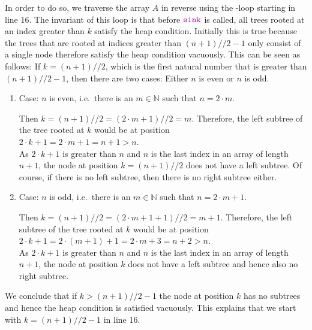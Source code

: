 \begin{enumerate}
\begin{enumerate}
            In order to do so, we traverse the array ${A}$ in reverse using the
            -loop starting in line 16.  The invariant of this loop is that before
            $\mytt{sink}$ is called, all trees rooted at an index greater than 
            ${k}$ satisfy the heap condition.  Initially this is true because the trees that
            are rooted at indices greater than  $(n + 1) // 2 - 1$  only
            consist of a single node therefore satisfy the heap condition vacuously.  This can be seen as
            follows:  If $k = (n + 1)//2$, which is the first 
            natural number that is greater than $(n + 1) // 2 - 1$, then there are two cases:
            Either $n$ is even or $n$ is odd.
            \begin{enumerate}
            \item Case: $n$ is even, i.e.~there is an $m\in \mathbb{N}$ such that $n = 2 \cdot m$.

                  Then $k = (n + 1)//2 = (2 \cdot m + 1) // 2 = m$.  Therefore, the left subtree of the tree 
                  rooted at $k$ would be at position 
                  \\[0.2cm]
                  \hspace*{1.3cm}
                  $2 \cdot k + 1 = 2 \cdot m + 1 = n + 1 > n$.
                  \\[0.2cm]
                  As $2 \cdot k  + 1$ is greater than $n$ and $n$ is the last index in an array of length $n+1$, the
                  node at position $k = (n+1)//2$ does not have a left subtree.
                  Of course, if there is no left subtree, then there is no right subtree either.
            \item Case: $n$ is odd, i.e.~there is an $m \in \mathbb{N}$ such that $n = 2 \cdot m + 1$.

                  Then $k = (n + 1)//2 = (2 \cdot m + 1 + 1) // 2 = m + 1$.  Therefore, the left subtree
                  of the tree rooted at $k$ would be at position
                  \\[0.2cm]
                  \hspace*{1.3cm}
                  $2 \cdot k + 1 = 2 \cdot (m + 1) + 1 = 2 \cdot m + 3 = n + 2 > n$.
                  \\[0.2cm]
                  As $2 \cdot k + 1$ is greater than $n$ and $n$ is the last index in an array of length $n+1$, 
                  the node at position $k$ does not have a left subtree and hence also no right subtree. 
            \end{enumerate}
            We conclude that if $k > (n + 1)//2 - 1$ the node at position $k$ has no subtrees and hence the heap
            condition is satisfied vacuously.   This explains that we start with $k = (n+1)//2 - 1$ in line 16.
            

\end{enumerate}
\end{enumerate}
